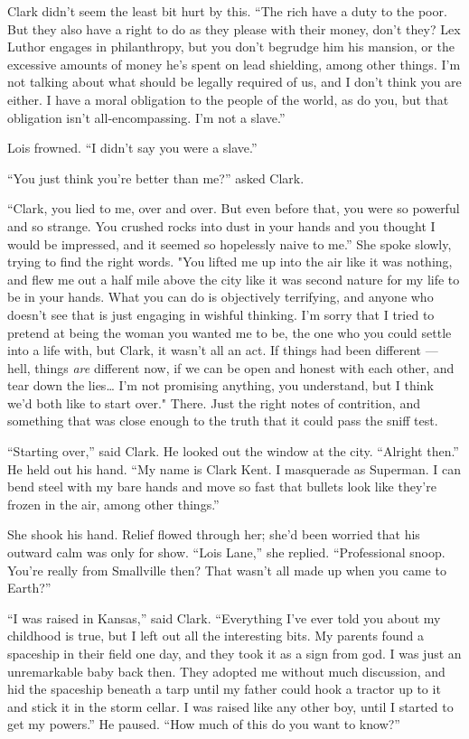 Clark didn't seem the least bit hurt by this. ``The rich have a duty to
the poor. But they also have a right to do as they please with their
money, don't they? Lex Luthor engages in philanthropy, but you don't
begrudge him his mansion, or the excessive amounts of money he's spent
on lead shielding, among other things. I'm not talking about what should
be legally required of us, and I don't think you are either. I have a
moral obligation to the people of the world, as do you, but that
obligation isn't all‐encompassing. I'm not a slave.''

Lois frowned. ``I didn't say you were a slave.''

``You just think you're better than me?'' asked Clark.

``Clark, you lied to me, over and over. But even before that, you were
so powerful and so strange. You crushed rocks into dust in your hands
and you thought I would be impressed, and it seemed so hopelessly naive
to me.'' She spoke slowly, trying to find the right words. "You lifted
me up into the air like it was nothing, and flew me out a half mile
above the city like it was second nature for my life to be in your
hands. What you can do is objectively terrifying, and anyone who doesn't
see that is just engaging in wishful thinking. I'm sorry that I tried to
pretend at being the woman you wanted me to be, the one who you could
settle into a life with, but Clark, it wasn't all an act. If things had
been different --- hell, things \emph{are} different now, if we can be
open and honest with each other, and tear down the lies\ldots{} I'm not
promising anything, you understand, but I think we'd both like to start
over." There. Just the right notes of contrition, and something that was
close enough to the truth that it could pass the sniff test.

``Starting over,'' said Clark. He looked out the window at the city.
``Alright then.'' He held out his hand. ``My name is Clark Kent. I
masquerade as Superman. I can bend steel with my bare hands and move so
fast that bullets look like they're frozen in the air, among other
things.''

She shook his hand. Relief flowed through her; she'd been worried that
his outward calm was only for show. ``Lois Lane,'' she replied.
``Professional snoop. You're really from Smallville then? That wasn't
all made up when you came to Earth?''

``I was raised in Kansas,'' said Clark. ``Everything I've ever told you
about my childhood is true, but I left out all the interesting bits. My
parents found a spaceship in their field one day, and they took it as a
sign from god. I was just an unremarkable baby back then. They adopted
me without much discussion, and hid the spaceship beneath a tarp until
my father could hook a tractor up to it and stick it in the storm
cellar. I was raised like any other boy, until I started to get my
powers.'' He paused. ``How much of this do you want to know?''

